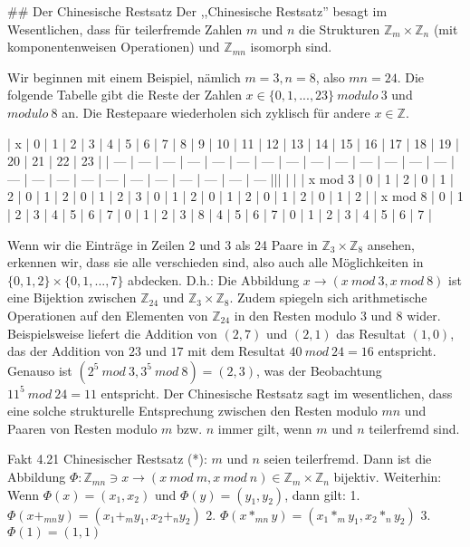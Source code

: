 \documentclass[a4paper]{article}
\begin{document}
\begin{multicols}{3}
## Der Chinesische Restsatz
Der ,,Chinesische Restsatz'' besagt im Wesentlichen, dass für teilerfremde Zahlen $m$ und $n$ die Strukturen $\mathbb{Z}_m \times\mathbb{Z}_n$ (mit komponentenweisen Operationen) und $\mathbb{Z}_{mn}$ isomorph sind.

Wir beginnen mit einem Beispiel, nämlich $m=3,n=8$, also $mn=24$. Die folgende Tabelle gibt die Reste der Zahlen $x\in\{0,1,...,23\}\ modulo\ 3$ und $modulo\ 8$ an. Die Restepaare wiederholen sich zyklisch für andere $x\in\mathbb{Z}$.

| x   | 0   | 1   | 2   | 3   | 4   | 5   | 6   | 7   | 8   | 9   | 10  | 11  | 12  | 13  | 14  | 15  | 16  | 17  | 18  | 19  | 20  | 21  | 22  | 23  |
| --- | --- | --- | --- | --- | --- | --- | --- | --- | --- | --- | --- | --- | --- | --- | --- | --- | --- | --- | --- | --- | --- | --- | --- | --- |||  |  |
| x mod 3 | 0   | 1   | 2   | 0   | 1   | 2   | 0   | 1   | 2   | 0   | 1   | 2   | 3   | 0   | 1   | 2   | 0   | 1   | 2   | 0   | 1   | 2   | 0   | 1   | 2   |
| x mod 8 | 0   | 1   | 2   | 3   | 4   | 5   | 6   | 7   | 0   | 1   | 2   | 3   | 8   | 4   | 5   | 6   | 7   | 0   | 1   | 2   | 3   | 4   | 5   | 6   | 7   |

Wenn wir die Einträge in Zeilen 2 und 3 als 24 Paare in $\mathbb{Z}_3 \times\mathbb{Z}_8$ ansehen, erkennen wir, dass sie alle verschieden sind, also auch alle Möglichkeiten in $\{0,1,2\}\times\{0,1,...,7\}$ abdecken. D.h.: Die Abbildung $x\rightarrow (x\ mod\ 3,x\ mod\ 8)$ ist eine Bijektion zwischen $\mathbb{Z}_{24}$ und $\mathbb{Z}_3\times\mathbb{Z}_8$. Zudem spiegeln sich arithmetische Operationen auf den Elementen von $\mathbb{Z}_{24}$ in den Resten modulo $3$ und $8$ wider. Beispielsweise liefert die Addition von $(2,7)$ und $(2,1)$ das Resultat $(1,0)$, das der Addition von $23$ und $17$ mit dem Resultat $40\ mod\ 24 = 16$ entspricht. Genauso ist $(2^5\ mod\ 3, 3^5\ mod\ 8)=(2,3)$, was der Beobachtung $11^5\ mod\ 24 = 11$ entspricht.
Der Chinesische Restsatz sagt im wesentlichen, dass eine solche strukturelle Entsprechung zwischen den Resten modulo $mn$ und Paaren von Resten modulo $m$ bzw. $n$ immer gilt, wenn $m$ und $n$ teilerfremd sind.

Fakt 4.21 Chinesischer Restsatz (*): $m$ und $n$ seien teilerfremd. Dann ist die Abbildung $\Phi:\mathbb{Z}_{mn} \owns x \rightarrow (x\ mod\ m, x\ mod\ n)\in\mathbb{Z}_m\times\mathbb{Z}_n$ bijektiv. Weiterhin: Wenn $\Phi(x)=(x_1,x_2)$ und $\Phi(y)=(y_1,y_2)$, dann gilt:
1. $\Phi(x+_{mn} y) = (x_1 +_m y_1 , x_2 +_n y_2)$
2. $\Phi(x*_{mn} y) = (x_1 *_m y_1 , x_2 *_n y_2)$
3. $\Phi(1) = (1,1)$


\end{multicols}
\end{document}
